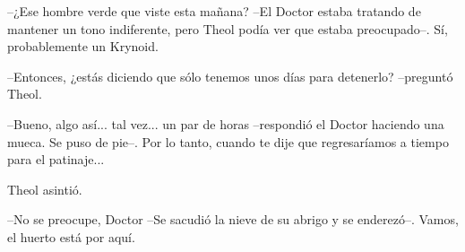 --¿Ese hombre verde que viste esta mañana? --El Doctor estaba tratando de mantener un tono indiferente, pero Theol podía ver que estaba preocupado--. Sí, probablemente un Krynoid.



--Entonces, ¿estás diciendo que sólo tenemos unos días para detenerlo? --preguntó Theol.



--Bueno, algo así... tal vez... un par de horas --respondió el Doctor haciendo una mueca. Se puso de pie--. Por lo tanto, cuando te dije que regresaríamos a tiempo para el patinaje...



Theol asintió.

 --No se preocupe, Doctor --Se sacudió la nieve de su abrigo y se enderezó--. Vamos, el huerto está por aquí.